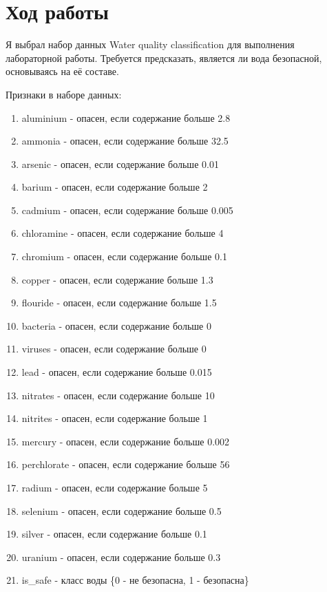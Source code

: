 \graphicspath{{png/}}

\section{Ход работы}

Я выбрал набор данных Water quality classification \cite{kaggle} для выполнения лабораторной работы. Требуется предсказать, является ли вода безопасной, основываясь на её составе.

Признаки в наборе данных:

\begin{enumerate}
    \item
    aluminium - опасен, если содержание больше 2.8
    \item
    ammonia - опасен, если содержание больше 32.5
    \item
    arsenic - опасен, если содержание больше 0.01
    \item
    barium - опасен, если содержание больше 2
    \item
    cadmium - опасен, если содержание больше 0.005
    \item
    chloramine - опасен, если содержание больше 4
    \item
    chromium - опасен, если содержание больше 0.1
    \item
    copper - опасен, если содержание больше 1.3
    \item
    flouride - опасен, если содержание больше 1.5
    \item
    bacteria - опасен, если содержание больше 0
    \item
    viruses - опасен, если содержание больше 0
    \item
    lead - опасен, если содержание больше 0.015
    \item
    nitrates - опасен, если содержание больше 10
    \item
    nitrites - опасен, если содержание больше 1
    \item
    mercury - опасен, если содержание больше 0.002
    \item
    perchlorate - опасен, если содержание больше 56
    \item
    radium - опасен, если содержание больше 5
    \item
    selenium - опасен, если содержание больше 0.5
    \item
    silver - опасен, если содержание больше 0.1
    \item
    uranium - опасен, если содержание больше 0.3
    \item
    is\_safe - класс воды \{0 - не безопасна, 1 - безопасна\}
\end{enumerate}

